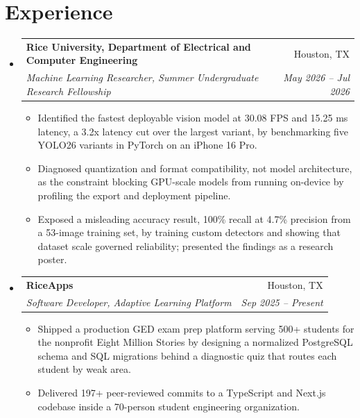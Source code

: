 \documentclass[letterpaper,10pt]{article}
\makeatletter
\newcommand{\resumeItem}[1]{\item\small{#1 \vspace{-1pt}}}
\newcommand{\resumeSubheading}[4]{
  \vspace{-1pt}\item
    \begin{tabular*}{0.98\textwidth}[t]{l@{\extracolsep{\fill}}r}
      \textbf{#1} & #2 \\
      \textit{\small#3} & \textit{\small #4} \\
    \end{tabular*}\vspace{-4pt}
}
\newcommand{\resumeSubHeadingListStart}{\begin{itemize}[leftmargin=0.12in, label={}]}
\newcommand{\resumeSubHeadingListEnd}{\end{itemize}}
\newcommand{\resumeItemListStart}{\begin{itemize}[label=$\bullet$,leftmargin=0.2in,topsep=1pt,itemsep=1pt,parsep=0pt]}
\newcommand{\resumeItemListEnd}{\end{itemize}\vspace{-3pt}}
\makeatother
\begin{document}
\section{Experience}
  \resumeSubHeadingListStart
    \resumeSubheading
      {Rice University, Department of Electrical and Computer Engineering}{Houston, TX}
      {Machine Learning Researcher, Summer Undergraduate Research Fellowship}{May 2026 -- Jul 2026}
      \resumeItemListStart
        \resumeItem{Identified the fastest deployable vision model at 30.08 FPS and 15.25 ms latency, a 3.2x latency cut over the largest variant, by benchmarking five YOLO26 variants in PyTorch on an iPhone 16 Pro.}
        \resumeItem{Diagnosed quantization and format compatibility, not model architecture, as the constraint blocking GPU-scale models from running on-device by profiling the export and deployment pipeline.}
        \resumeItem{Exposed a misleading accuracy result, 100\% recall at 4.7\% precision from a 53-image training set, by training custom detectors and showing that dataset scale governed reliability; presented the findings as a research poster.}
      \resumeItemListEnd
    \resumeSubheading
      {RiceApps}{Houston, TX}
      {Software Developer, Adaptive Learning Platform}{Sep 2025 -- Present}
      \resumeItemListStart
        \resumeItem{Shipped a production GED exam prep platform serving 500+ students for the nonprofit Eight Million Stories by designing a normalized PostgreSQL schema and SQL migrations behind a diagnostic quiz that routes each student by weak area.}
        \resumeItem{Delivered 197+ peer-reviewed commits to a TypeScript and Next.js codebase inside a 70-person student engineering organization.}
      \resumeItemListEnd
  \resumeSubHeadingListEnd
\end{document}
